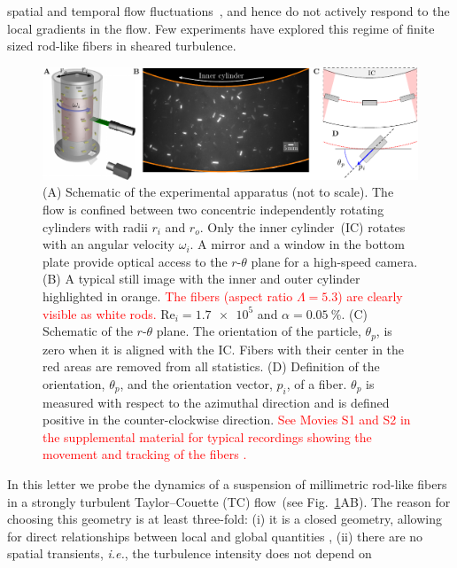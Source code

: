 \documentclass[aps, pre, onecolumn, superscriptaddress,longbibliography]{revtex4-1}
\newcommand{\makered}[1]{\textcolor{red}{#1}}
\begin{document}
spatial and temporal flow fluctuations~\cite{Toschi2009, Calzavarini2009,
Bec2010, Bellani2012, Bellani2012b, Mathai2015, Almeras2017, Bakhuis2018,
Mathai2018}, and hence do not actively respond to the local gradients in the
flow. Few experiments have explored this regime of finite sized rod-like
fibers in sheared turbulence.\\
%
\begin{figure}[htp] %
\centering
\includegraphics{figure1setupfiber.pdf}
\caption{(A) Schematic of the experimental apparatus (not to scale). The flow
is confined between two concentric independently rotating cylinders with radii
$r_i$ and $r_o$. Only the inner cylinder~(IC) rotates with an angular velocity
$\omega_i$. A mirror and a window in the bottom plate provide optical access
to the $r$-$\theta$ plane for a high-speed camera. (B) A typical still image
with the inner and outer cylinder highlighted in orange.  \makered{The fibers (aspect ratio $\Lambda =5.3$) are clearly visible as white rods.} $\text{Re}_i = \num{1.7e5}$ and $\alpha = \SI{0.05}{\percent}$. (C) Schematic of the $r$-$\theta$ plane. The orientation of the particle, $\theta_p$, is zero when it is aligned with the IC. Fibers with their center in the red areas are removed from all statistics. (D) Definition of the orientation, $\theta_p$, and the orientation vector, $p_i$, of a fiber. $\theta_p$ is measured with respect to the azimuthal direction and is defined positive in the counter-clockwise direction. \makered{See Movies S1 and S2 in the supplemental material for typical recordings showing the movement and tracking of the fibers \citep{Video1,Video2}.}}
\label{fig:setup}
\end{figure}
%
\indent In this letter we probe the dynamics of a suspension of millimetric
rod-like fibers in a strongly turbulent Taylor--Couette (TC) flow~(see
Fig.~\ref{fig:setup}AB). The reason for choosing this geometry is at least
three-fold: (i) it is a closed geometry, allowing for direct relationships
between local and global quantities \cite{Eckhardt2007}, (ii) there are no
spatial transients, \textit{i.e.}, the turbulence intensity does not depend on
\end{document}
